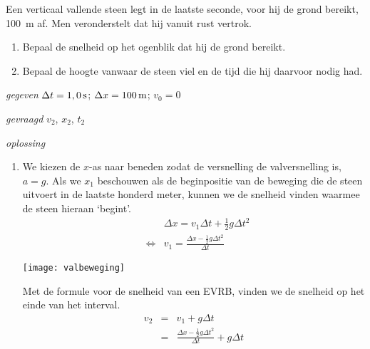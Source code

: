

Een verticaal vallende steen legt in de laatste seconde, voor hij de grond bereikt, \SI{100}{m} af. Men veronderstelt dat hij vanuit rust vertrok.
\begin{enumerate}
\item Bepaal de snelheid op het ogenblik dat hij de grond bereikt.
\item Bepaal de hoogte vanwaar de steen viel en de tijd die hij daarvoor nodig had.
\end{enumerate}

\begin{oplossing}
\item[\textit{gegeven}]$\Delta t=1,0\rm\,s$; $\Delta x=100\rm\,m$; $v_0=0$
\item[\textit{gevraagd}]$v_2$, $x_2$, $t_2$
\item[\textit{oplossing}]
\begin{enumerate}
\item 
\begin{minipage}[t]{.7\textwidth}
We kiezen de $x$-as naar beneden zodat de versnelling de valversnelling is, $a=g$. Als we $x_1$ beschouwen als de beginpositie van de beweging die de steen uitvoert in de laatste honderd meter, kunnen we de snelheid vinden waarmee de steen hieraan `begint'.
\begin{eqnarray*}
&&\Delta x=v_1\Delta t+\frac{1}{2}g\Delta t^2\\
&\Leftrightarrow&v_1=\frac{\Delta x-\frac{1}{2}g\Delta t^2}{\Delta t}
\end{eqnarray*}
\end{minipage}
\begin{minipage}[t][4.5cm][b]{.3\textwidth}
\texttt{[image: valbeweging]}
\end{minipage}
\newline
\newline
\newline
Met de formule voor de snelheid van een EVRB, vinden we de snelheid op het einde van het interval.
\begin{eqnarray*}
v_2&=&v_1+g\Delta t\\
&=&\frac{\Delta x-\frac{1}{2}g\Delta t^2}{\Delta t}+g\Delta t\\

\end{eqnarray*}
\end{enumerate}
\end{oplossing}
